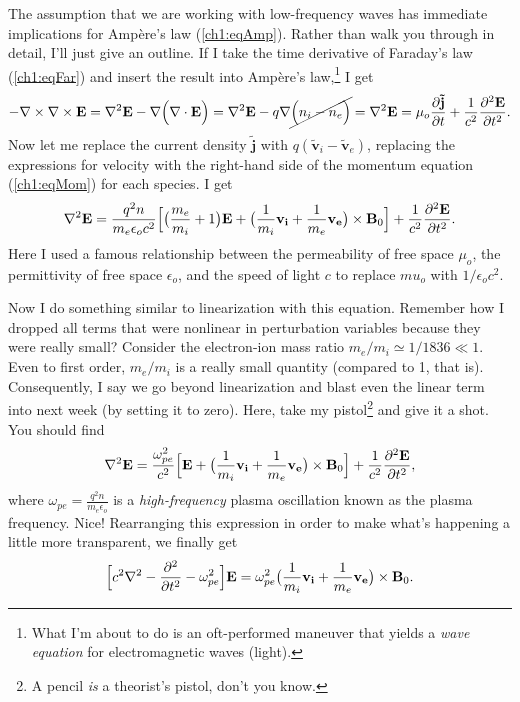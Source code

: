 The assumption that we are working with low-frequency waves has immediate
implications for Amp\`{e}re's law (\ref{ch1:eqAmp}). Rather than walk you
through in detail, I'll just give an outline. If I take the time derivative of
Faraday's law (\ref{ch1:eqFar}) and insert the result into Amp\`{e}re's
law,\footnote{What I'm about to do is an oft-performed maneuver that yields a
  \emph{wave equation} for electromagnetic waves (light).} I get
\begin{equation} - {\bf \nabla} \times {\bf \nabla} \times \mathbf{E} = {\bf \nabla}^2 \mathbf{E} -
  {\bf \nabla} \Big ( {\bf \nabla} \cdot \mathbf{E} \Big ) = {\bf \nabla}^2 \mathbf{E} - q {\bf \nabla}
  \cancel{\Big ( n_i - n_e \Big )} = {\bf \nabla}^2 \mathbf{E} = \mu_o \dfrac{\partial
    \mathbf{\tilde j}}{\partial t} + \dfrac{1}{c^2} \dfrac{\partial^2
    \mathbf{E}}{\partial t^2}.
\end{equation} 
Now let me replace the current density $\mathbf{\tilde j}$ with
$q ( \mathbf{\tilde v}_i - \mathbf{\tilde v}_e )$, replacing the expressions for
velocity with the right-hand side of the momentum equation (\ref{ch1:eqMom}) for
each species. I get
\begin{equation} {\bf \nabla}^2 \mathbf{E} = \dfrac{q^2 n }{m_e \epsilon_o c^2} \Big [ \big (
  \dfrac{m_e}{m_i} + 1 \big ) \mathbf{E} + \big ( \dfrac{1}{m_i} \mathbf{v_i} +
  \dfrac{1}{m_e} \mathbf{v_e} \big ) \times \mathbf{B}_0 \Big ] + \dfrac{1}{c^2}
  \dfrac{\partial^2 \mathbf{E}}{\partial t^2}.
\end{equation} 
Here I used a famous relationship between the permeability of free space
$\mu_o$, the permittivity of free space $\epsilon_o$, and the speed of light $c$
to replace $mu_o$ with $1 / \epsilon_o c^2$. 

Now I do something similar to linearization with this equation. Remember how I
dropped all terms that were nonlinear in perturbation variables because they
were really small? Consider the electron-ion mass ratio
$m_e / m_i \simeq 1 / 1836 \ll 1$. Even to first order, $m_e / m_i$ is a really
small quantity (compared to 1, that is). Consequently, I say we go beyond
linearization and blast even the linear term into next week (by setting it to
zero). Here, take my pistol\footnote{A pencil \emph{is} a theorist's pistol,
  don't you know.} and give it a shot. You should find
\begin{equation} {\bf \nabla}^2 \mathbf{E} = \dfrac{\omega_{pe}^2}{c^2} \Big [
  \mathbf{E} + \big ( \dfrac{1}{m_i} \mathbf{v_i} + \dfrac{1}{m_e} \mathbf{v_e}
  \big ) \times \mathbf{B}_0 \Big ] + \dfrac{1}{c^2} \dfrac{\partial^2
    \mathbf{E}}{\partial t^2},
\end{equation} 
where $\omega_{pe} = \frac{q^2 n}{m_e \epsilon_o}$ is a \emph{high-frequency}
plasma oscillation known as the plasma frequency. Nice!  Rearranging this
expression in order to make what's happening a little more transparent, we finally get
\begin{equation} \Big [ c^2 {\bf \nabla}^2 - \dfrac{\partial^2}{\partial t^2} -
  \omega_{pe}^2 \Big ] \mathbf{E} = \omega_{pe}^2 \big ( \dfrac{1}{m_i}
  \mathbf{v_i} + \dfrac{1}{m_e} \mathbf{v_e} \big ) \times \mathbf{B}_0.
\end{equation} 

